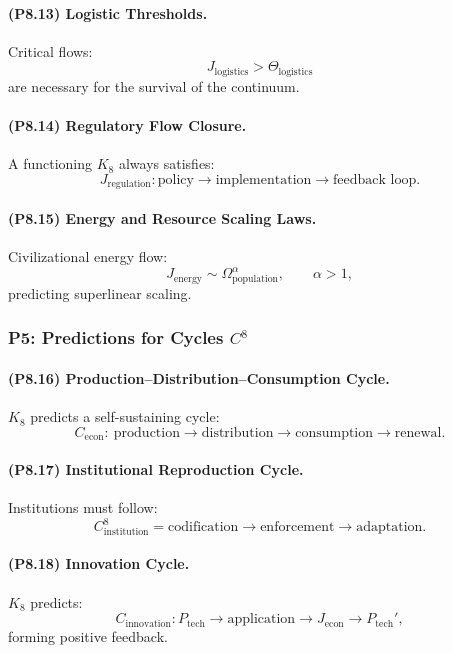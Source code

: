 \paragraph{(P8.13) Logistic Thresholds.}
Critical flows:
\[
J_{\mathrm{logistics}} > \Theta_{\mathrm{logistics}}
\]
are necessary for the survival of the continuum.

\paragraph{(P8.14) Regulatory Flow Closure.}
A functioning $K_8$ always satisfies:
\[
J_{\mathrm{regulation}}: \text{policy} 
\to \text{implementation} 
\to \text{feedback loop}.
\]

\paragraph{(P8.15) Energy and Resource Scaling Laws.}
Civilizational energy flow:
\[
J_{\mathrm{energy}} \sim \Omega_{\mathrm{population}}^\alpha,
\qquad 
\alpha > 1,
\]
predicting superlinear scaling.

\subsubsection{P5: Predictions for Cycles $C^{8}$}

\paragraph{(P8.16) Production–Distribution–Consumption Cycle.}
$K_8$ predicts a self-sustaining cycle:
\[
C_{\mathrm{econ}}
: \ 
\text{production} 
\to \text{distribution} 
\to \text{consumption} 
\to \text{renewal}.
\]

\paragraph{(P8.17) Institutional Reproduction Cycle.}
Institutions must follow:
\[
C_{\mathrm{institution}}^8 
=
\text{codification} 
\to \text{enforcement} 
\to \text{adaptation}.
\]

\paragraph{(P8.18) Innovation Cycle.}
$K_8$ predicts:
\[
C_{\mathrm{innovation}} 
: P_{\mathrm{tech}} 
\to \text{application} 
\to J_{\mathrm{econ}} 
\to P_{\mathrm{tech}}',
\]
forming positive feedback.

